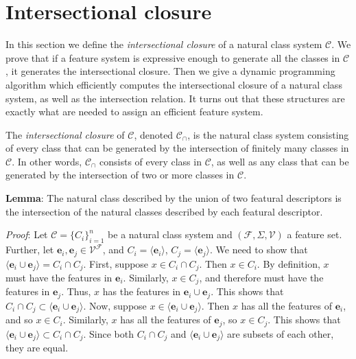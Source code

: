 \documentclass[11pt, oneside]{article}   	%
\begin{document}
\section{Intersectional closure}

In this section we define the \textit{intersectional closure} of a natural class system $\mathcal C$. We prove that if a feature system is expressive enough to generate all the classes in $\mathcal C$, it generates the intersectional closure. Then we give a dynamic programming algorithm which efficiently computes the intersectional closure of a natural class system, as well as the intersection relation. It turns out that these structures are exactly what are needed to assign an efficient feature system.

The \textit{intersectional closure} of $\mathcal C$, denoted $\mathcal C_\cap$, is the natural class system consisting of every class that can be generated by the intersection of finitely many classes in $\mathcal C$. In other words, $\mathcal C_\cap$ consists of every class in $\mathcal C$, as well as any class that can be generated by the intersection of two or more classes in $\mathcal C$.

\vspace{\baselineskip} \noindent \textbf{Lemma}: The natural class described by the union of two featural descriptors is the intersection of the natural classes described by each featural descriptor.

\textit{Proof}: Let $\mathcal C = \{C_i\}_{i=1}^n$ be a natural class system and $(\mathcal F, \Sigma, \mathcal V)$ a feature set.
Further, let $\mathbf{e}_i, \mathbf{e}_j \in \mathcal V^\mathcal F$, and $C_i = \langle \mathbf{e}_i \rangle$, $C_j = \langle \mathbf{e}_j \rangle$.
We need to show that $\langle \mathbf{e}_i \cup \mathbf{e}_j \rangle = C_i \cap C_j$.
First, suppose $x \in C_i \cap C_j$. Then $x \in C_i$. By definition, $x$ must have the features in $\mathbf{e}_i$.
Similarly, $x \in C_j$, and therefore must have the features in $\mathbf{e}_j$.
Thus, $x$ has the features in $\mathbf{e}_i \cup \mathbf{e}_j$. This shows that $C_i \cap C_j \subset \langle \mathbf{e}_i \cup \mathbf{e}_j \rangle$.
Now, suppose $x \in \langle \mathbf{e}_i \cup \mathbf{e}_j \rangle$. Then $x$ has all the features of $\mathbf{e}_i$, and so $x \in C_i$.
Similarly, $x$ has all the features of $\mathbf{e}_j$, so $x \in C_j$. This shows that $\langle \mathbf{e}_i \cup \mathbf{e}_j \rangle \subset C_i \cap C_j$.
Since both $C_i \cap C_j$ and $\langle \mathbf{e}_i \cup \mathbf{e}_j \rangle$ are subsets of each other, they are equal.
\end{document}
